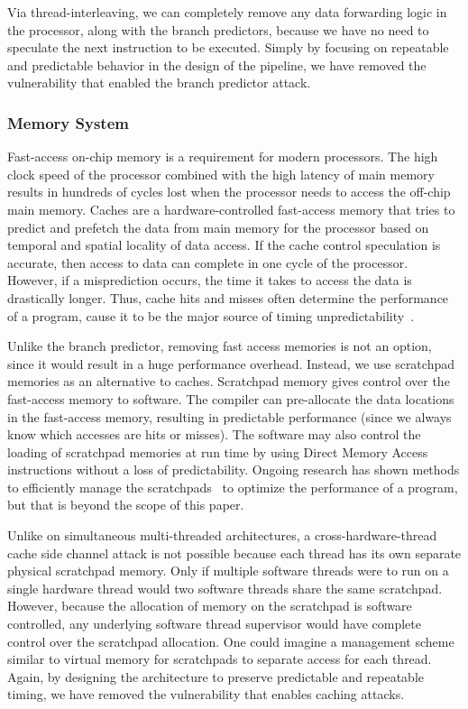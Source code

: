 \documentclass[times, 10pt,twocolumn]{article}
\begin{document}
Via thread-interleaving, we can completely remove any data forwarding logic in the processor, along with the branch predictors, because we have no need to speculate the next instruction to be executed. Simply by focusing on repeatable and predictable behavior in the design of the pipeline, we have removed the vulnerability that enabled the branch predictor attack. 

\subsubsection {Memory System}
Fast-access on-chip memory is a requirement for modern processors. The high clock speed of the processor combined with the high latency of main memory results in hundreds of cycles lost when the processor needs to access the off-chip main memory. Caches are a hardware-controlled fast-access memory that tries to predict and prefetch the data from main memory for the processor based on temporal and spatial locality of data access. If the cache control speculation is accurate, then access to data can complete in one cycle of the processor. However, if a misprediction occurs, the time it takes to access the data is drastically longer. Thus, cache hits and misses often determine the performance of a program, cause it to be the major source of timing unpredictability~\cite{thiele:04:predictable}.

Unlike the branch predictor, removing fast access memories is not an option, since it would result in a huge performance overhead. Instead, we use scratchpad memories as an alternative to caches. Scratchpad memory gives control over the fast-access memory to software. The compiler can pre-allocate the data locations in the fast-access memory, resulting in predictable performance (since we always know which accesses are hits or misses). The software may also control the loading of scratchpad memories at run time by using Direct Memory Access instructions without a loss of predictability. Ongoing research has shown methods to efficiently manage the scratchpads~\cite{avissar2002oma, Bandyopadhyay:EECS-2006-105, Patel:EECS-2008-115} to optimize the performance of a program, but that is  beyond the scope of this paper. 

Unlike on simultaneous multi-threaded architectures, a cross-hardware-thread cache side channel attack is not possible because each thread has its own separate physical scratchpad memory. Only if multiple software threads were to run on a single hardware thread would two software threads share the same scratchpad. However, because the allocation of memory on the scratchpad is software controlled, any underlying software thread supervisor would have complete control over the scratchpad allocation. One could imagine a management scheme similar to virtual memory for scratchpads to separate access for each thread. Again, by designing the architecture to preserve predictable and repeatable timing, we have removed the vulnerability that enables caching attacks.
\end{document}
